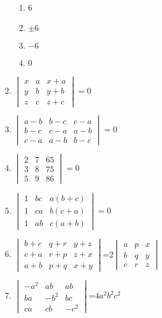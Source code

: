 \documentclass[journal,12pt,twocolumn]{IEEEtran}
\renewcommand\thesection{\arabic{section}}
\begin{document}
\begin{enumerate}[label=\thesection.\arabic*.,ref=\thesection.\theenumi]
\begin{enumerate}
\item 6
\item $\pm 6$
\item $-6$
\item 0
\end{enumerate}
\item $\begin{vmatrix}
x&a&x+a\\y&b&y+b\\z&c&z+c\end{vmatrix}=0$
\\
\solution 

\item $\begin{vmatrix}
a-b&b-c&c-a\\b-c&c-a&a-b\\c-a&a-b&b-c\end{vmatrix}=0$
\\
\solution 

\item $\begin{vmatrix}2&7&65\\3&8&75\\5&9&86\end{vmatrix}=0$
\\
\solution 

\item $\begin{vmatrix}1&bc&a(b+c)\\1&ca&b(c+a)\\1&ab&c(a+b)\end{vmatrix}=0$
\\
\solution 

\item $\begin{vmatrix}b+c& q+r& y+z\\c+a& r+p& z+x\\a+b& p+q& x+y\end{vmatrix}$=2$\begin{vmatrix} a&p&x\\b&q&y\\c&r&z\end{vmatrix}$ 
\\
\solution 

\item $\begin{vmatrix}-a^2&ab&ab\\ ba&-b^2&bc\\ ca&cb&-c^2\end{vmatrix}$=$4a^2b^2c^2$\\

\end{enumerate}
\end{document}
